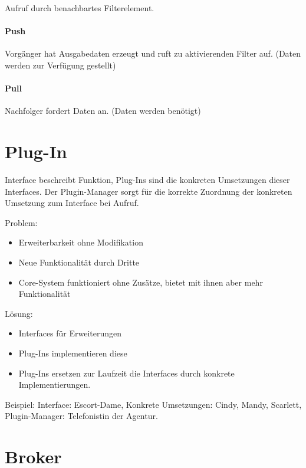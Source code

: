 Aufruf durch benachbartes Filterelement.

\paragraph{Push}\label{push}

Vorgänger hat Ausgabedaten erzeugt und ruft zu aktivierenden Filter auf.
(Daten werden zur Verfügung gestellt)

\paragraph{Pull}\label{pull}

Nachfolger fordert Daten an. (Daten werden benötigt)

\section{Plug-In}\label{plug-in}

Interface beschreibt Funktion, Plug-Ins sind die konkreten Umsetzungen
dieser Interfaces. Der Plugin-Manager sorgt für die korrekte Zuordnung
der konkreten Umsetzung zum Interface bei Aufruf.

Problem:

\begin{itemize}
\itemsep1pt\parskip0pt
\item
  Erweiterbarkeit ohne Modifikation
\item
  Neue Funktionalität durch Dritte
\item
  Core-System funktioniert ohne Zusätze, bietet mit ihnen aber mehr
  Funktionalität
\end{itemize}

Lösung:

\begin{itemize}
\itemsep1pt\parskip0pt
\item
  Interfaces für Erweiterungen
\item
  Plug-Ins implementieren diese
\item
  Plug-Ins ersetzen zur Laufzeit die Interfaces durch konkrete
  Implementierungen.
\end{itemize}

Beispiel: Interface: Escort-Dame, Konkrete Umsetzungen: Cindy, Mandy,
Scarlett, Plugin-Manager: Telefonistin der Agentur.

\section{Broker}\label{broker}

